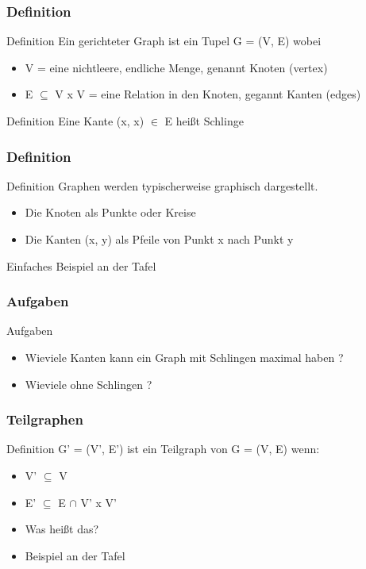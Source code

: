 \documentclass{beamer}
\begin{document}
\begin{frame}
	\frametitle{Definition}
	\begin{block}{Definition}
		Ein gerichteter Graph ist ein Tupel G = (V, E) wobei
		\begin{itemize}
			\item V = eine nichtleere, endliche Menge, genannt Knoten (vertex)
			\item E $\subseteq$ V x V = eine Relation in den Knoten, gegannt Kanten (edges)
		\end{itemize}	
	\end{block}
	\begin{block}{Definition}
		Eine Kante (x, x) $\in$ E hei{\ss}t Schlinge
	\end{block}
\end{frame}

\begin{frame}
	\frametitle{Definition}
	\begin{block}{Definition }
		Graphen werden typischerweise graphisch dargestellt.
		\begin{itemize}
			\item Die Knoten als Punkte oder Kreise
			\item Die Kanten (x, y) als Pfeile von Punkt x nach Punkt y
		\end{itemize}
	\end{block}

	\begin{example}
		Einfaches Beispiel an der Tafel
	\end{example}
\end{frame}

\begin{frame}
	\frametitle{Aufgaben}
	\begin{block}{Aufgaben }
		\begin{itemize}
			\item Wieviele Kanten kann ein Graph mit Schlingen maximal haben ?
			\item Wieviele ohne Schlingen ?
		\end{itemize}
	\end{block}
\end{frame}

\begin{frame}
	\frametitle{Teilgraphen}
	\begin{block}{Definition}
		 G' = (V', E') ist ein Teilgraph von G = (V, E) wenn:
		\begin{itemize}
			\item V' $\subseteq$ V
			\item E' $\subseteq$ E $\cap$ V' x V'
			\item Was hei{\ss}t das?
			\item Beispiel an der Tafel
		\end{itemize}	
	\end{block}
\end{frame}
\end{document}
